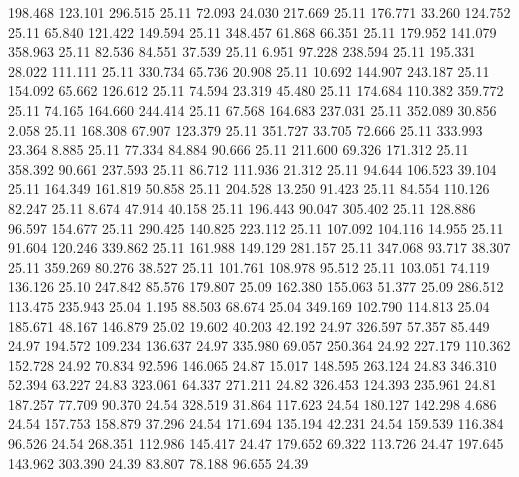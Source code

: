  198.468  123.101  296.515        25.11
  72.093   24.030  217.669        25.11
 176.771   33.260  124.752        25.11
  65.840  121.422  149.594        25.11
 348.457   61.868   66.351        25.11
 179.952  141.079  358.963        25.11
  82.536   84.551   37.539        25.11
   6.951   97.228  238.594        25.11
 195.331   28.022  111.111        25.11
 330.734   65.736   20.908        25.11
  10.692  144.907  243.187        25.11
 154.092   65.662  126.612        25.11
  74.594   23.319   45.480        25.11
 174.684  110.382  359.772        25.11
  74.165  164.660  244.414        25.11
  67.568  164.683  237.031        25.11
 352.089   30.856    2.058        25.11
 168.308   67.907  123.379        25.11
 351.727   33.705   72.666        25.11
 333.993   23.364    8.885        25.11
  77.334   84.884   90.666        25.11
 211.600   69.326  171.312        25.11
 358.392   90.661  237.593        25.11
  86.712  111.936   21.312        25.11
  94.644  106.523   39.104        25.11
 164.349  161.819   50.858        25.11
 204.528   13.250   91.423        25.11
  84.554  110.126   82.247        25.11
   8.674   47.914   40.158        25.11
 196.443   90.047  305.402        25.11
 128.886   96.597  154.677        25.11
 290.425  140.825  223.112        25.11
 107.092  104.116   14.955        25.11
  91.604  120.246  339.862        25.11
 161.988  149.129  281.157        25.11
 347.068   93.717   38.307        25.11
 359.269   80.276   38.527        25.11
 101.761  108.978   95.512        25.11
 103.051   74.119  136.126        25.10
 247.842   85.576  179.807        25.09
 162.380  155.063   51.377        25.09
 286.512  113.475  235.943        25.04
   1.195   88.503   68.674        25.04
 349.169  102.790  114.813        25.04
 185.671   48.167  146.879        25.02
  19.602   40.203   42.192        24.97
 326.597   57.357   85.449        24.97
 194.572  109.234  136.637        24.97
 335.980   69.057  250.364        24.92
 227.179  110.362  152.728        24.92
  70.834   92.596  146.065        24.87
  15.017  148.595  263.124        24.83
 346.310   52.394   63.227        24.83
 323.061   64.337  271.211        24.82
 326.453  124.393  235.961        24.81
 187.257   77.709   90.370        24.54
 328.519   31.864  117.623        24.54
 180.127  142.298    4.686        24.54
 157.753  158.879   37.296        24.54
 171.694  135.194   42.231        24.54
 159.539  116.384   96.526        24.54
 268.351  112.986  145.417        24.47
 179.652   69.322  113.726        24.47
 197.645  143.962  303.390        24.39
  83.807   78.188   96.655        24.39

